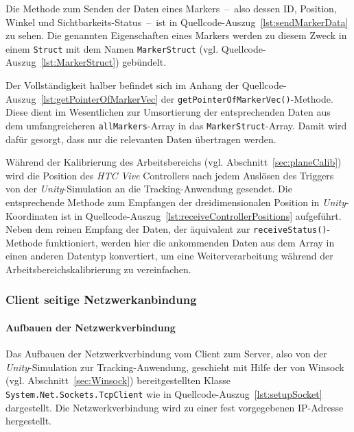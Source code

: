 Die Methode zum Senden der Daten eines Markers~--~also dessen ID, Position, Winkel und Sichtbarkeits-Status~--~ist in Quellcode-Auszug~\ref{lst:sendMarkerData} zu sehen. Die genannten Eigenschaften eines Markers werden zu diesem Zweck in einem \texttt{Struct} mit dem Namen \texttt{Marker\-Struct} (vgl. Quellcode-Auszug~\ref{lst:MarkerStruct}) gebündelt. 

 

Der Vollständigkeit halber befindet sich im Anhang der Quellcode-Auszug~\ref{lst:getPointerOfMarkerVec} der \texttt{get\-Pointer\-Of\-Marker\-Vec()}-Methode. Diese dient im Wesentlichen zur Umsortierung der entsprechenden Daten aus dem umfangreicheren \texttt{allMarkers}-Array in das \texttt{Marker\-Struct}-Array. Damit wird dafür gesorgt, dass nur die relevanten Daten übertragen werden. 

 

Während der Kalibrierung des Arbeitsbereichs (vgl. Abschnitt~\ref{sec:planeCalib}) wird die Position des \emph{HTC Vive} Controllers nach jedem Auslösen des Triggers von der \textit{Unity}-Simulation an die Tracking-Anwendung gesendet. Die entsprechende Methode zum Empfangen der dreidimensionalen Position in \emph{Unity}-Koordinaten ist in Quellcode-Auszug~\ref{lst:receiveControllerPositions} aufgeführt. Neben dem reinen Empfang der Daten, der äquivalent zur \texttt{receive\-Status()}-Methode funktioniert, werden hier die ankommenden Daten aus dem Array in einen anderen Datentyp konvertiert, um eine Weiterverarbeitung während der Arbeitsbereichskalibrierung zu vereinfachen. 






\subsubsection{Client seitige Netzwerkanbindung}
\paragraph{Aufbauen der Netzwerkverbindung}
Das Aufbauen der Netzwerkverbindung vom Client zum Server, also von der \textit{Unity}-Simulation zur Tracking-Anwendung, geschieht mit Hilfe der von Winsock (vgl. Abschnitt~\ref{sec:Winsock}) bereitgestellten Klasse \texttt{System.Net.Sockets.TcpClient} wie in Quellcode-Auszug~\ref{lst:setupSocket} dargestellt. Die Netzwerkverbindung wird zu einer fest vorgegebenen IP-Adresse hergestellt.

